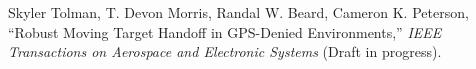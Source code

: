 

\begin{cvparagraph}
  Skyler Tolman, T. Devon Morris, Randal W. Beard, Cameron K. Peterson, ``Robust Moving Target Handoff in GPS-Denied Environments,'' \textit{IEEE Transactions on Aerospace and Electronic Systems} (Draft in progress).
\end{cvparagraph}

